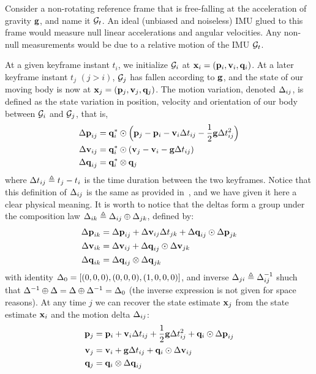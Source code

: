 Consider a non-rotating reference frame that is free-falling at the acceleration of gravity ${\bf g}$, and name it $\mathcal{G}_t$. 
An ideal (unbiased and noiseless) IMU glued to this frame would measure null linear accelerations and angular velocities. 
Any non-null measurements would be due to a relative motion of the IMU \wrt  $\mathcal{G}_t$.

At a given keyframe instant $t_i$, we initialize $\mathcal{G}_i$ at \mbox{${\bf x}_i=({\bf p}_i,{\bf v}_i,{\bf q}_i)$}.
At a later keyframe instant $t_j$ $(j > i)$,  $\mathcal{G}_j$ has fallen according to ${\bf g}$, and the state of our moving body is now at ${\bf x}_j=({\bf p}_j,{\bf v}_j,{\bf q}_j)$.
The motion variation, denoted $\Delta_{ij}$, is defined as the state variation in position, velocity and orientation of our body between $\mathcal{G}_i$ and  $\mathcal{G}_j$, that is,
%
\begin{align}\label{equ:delta_definition}
\begin{split}
{\Delta{\bf p}}_{ij} &= {\bf q}_i^*\odot\Big({\bf p}_j - {\bf p}_i - {\bf v}_i\Delta t_{ij} - \frac12{\bf g}\Delta t_{ij}^2\Big) \\
{\Delta{\bf v}}_{ij} &= {\bf q}_i^*\odot({\bf v}_j - {\bf v}_i - {\bf g}\Delta t_{ij}) \\
{\Delta{\bf q}}_{ij} &= {\bf q}_i^*\otimes{\bf q}_j 
\end{split}
\end{align}
%
where $\Delta t_{ij} \triangleq t_j - t_i$ is the time duration between the two keyframes. 
Notice that this definition of $\Delta_{ij}$ is the same as provided in~\cite{LUPTON-09,forster2015imu}, and we have given it here a clear physical meaning.
It is worth to notice that the deltas form a group under the composition law $\Delta_{ik}\triangleq\Delta_{ij}\oplus\Delta_{jk}$, defined by:
%
\begin{align} \label{equ:composition}
\begin{split}
{\Delta{\bf p}}_{ik} 
&= {\Delta{\bf p}}_{ij} + {\Delta{\bf v}}_{ij}\Delta t_{jk} + {\Delta{\bf q}}_{ij}\odot{\Delta{\bf p}}_{jk} \\
{\Delta{\bf v}}_{ik} 
&= {\Delta{\bf v}}_{ij} + {\Delta{\bf q}}_{ij}\odot{\Delta{\bf v}}_{jk} \\
{\Delta{\bf q}}_{ik} 
&= {\Delta{\bf q}}_{ij}\otimes{\Delta{\bf q}}_{jk} 
\end{split}
\end{align}
%
with identity $\Delta_0=[(0,0,0),(0,0,0),(1,0,0,0)]$, and inverse $\Delta_{ji}\triangleq\Delta_{ij}^{-1}$ shuch that $\Delta^{-1}\oplus\Delta=\Delta\oplus\Delta^{-1}=\Delta_0$ (the inverse expression is not given for space reasons).
At any time $j$ we can recover the state estimate ${\bf x}_j$ from the state estimate ${\bf x}_i$ and the motion delta $\Delta_{ij}$:
%
\begin{align} \label{equ:reconstruction}
\begin{split}
{\bf p}_j &= {\bf p}_i + {\bf v}_i\Delta t_{ij} + \frac12{\bf g}\Delta t_{ij}^2 + {\bf q}_i\odot{\Delta{\bf p}}_{ij} \\
{\bf v}_j &= {\bf v}_i + {\bf g}\Delta t_{ij} + {\bf q}_i\odot{\Delta{\bf v}}_{ij} \\
{\bf q}_j &= {\bf q}_i\otimes{\Delta{\bf q}}_{ij}   
\end{split}
\end{align}

